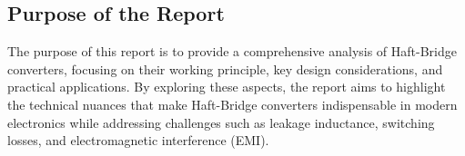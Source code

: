 \subsection{Purpose of the Report}
\noindent The purpose of this report is to provide a comprehensive analysis of Haft-Bridge converters, focusing on their working principle, key design considerations, and practical applications. By exploring these aspects, the report aims to highlight the technical nuances that make Haft-Bridge converters indispensable in modern electronics while addressing challenges such as leakage inductance, switching losses, and electromagnetic interference (EMI).
